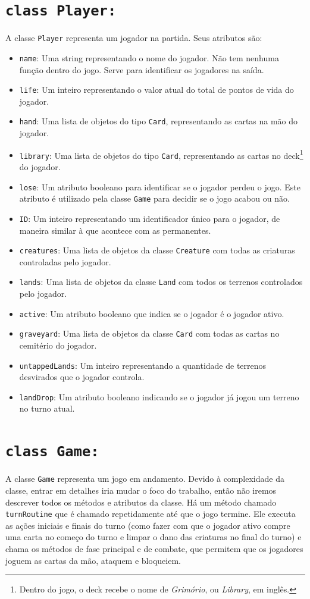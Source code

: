 \documentclass[dvipsnames]{book}
\begin{document}
\section{\texttt{class Player:}}
A classe \texttt{Player} representa um jogador na partida. Seus atributos são:
\begin{itemize}
  \item\texttt{name}: Uma string representando o nome do jogador. Não tem nenhuma função
  dentro do jogo. Serve para identificar os jogadores na saída.
  \item\texttt{life}: Um inteiro representando o valor atual do total de pontos de vida
  do jogador.
  \item\texttt{hand}: Uma lista de objetos do tipo \texttt{Card}, representando as cartas
  na mão do jogador.
  \item\texttt{library}: Uma lista de objetos do tipo \texttt{Card}, representando as cartas
  no deck\footnote{Dentro do jogo, o deck recebe o nome de \textit{Grimório}, ou \textit{Library},
  em inglês.} do jogador.
  \item\texttt{lose}: Um atributo booleano para identificar se o jogador perdeu o jogo. Este
  atributo é utilizado pela classe \texttt{Game} para decidir se o jogo acabou ou não.
  \item\texttt{ID}: Um inteiro representando um identificador único para o jogador, de maneira
  similar à que acontece com as permanentes.
  \item\texttt{creatures}: Uma lista de objetos da classe \texttt{Creature} com todas as
  criaturas controladas pelo jogador.
  \item\texttt{lands}: Uma lista de objetos da classe \texttt{Land} com todos os terrenos
  controlados pelo jogador.
  \item\texttt{active}: Um atributo booleano que indica se o jogador é o jogador ativo.
  \item\texttt{graveyard}: Uma lista de objetos da classe \texttt{Card} com todas as cartas
  no cemitério do jogador.
  \item\texttt{untappedLands}: Um inteiro representando a quantidade de terrenos desvirados que
  o jogador controla.
  \item\texttt{landDrop}: Um atributo booleano indicando se o jogador já jogou um terreno no
  turno atual.
\end{itemize}

\section{\texttt{class Game:}}
A classe \texttt{Game} representa um jogo em andamento. Devido à complexidade da classe, entrar
em detalhes iria mudar o foco do trabalho, então não iremos descrever todos os métodos e atributos
da classe. Há um método chamado \texttt{turnRoutine} que é chamado repetidamente até que o jogo
termine. Ele executa as ações iniciais e finais do turno (como fazer com que o jogador ativo compre
uma carta no começo do turno e limpar o dano das criaturas no final do turno) e chama os métodos de
fase principal e de combate, que permitem que os jogadores joguem as cartas da mão, ataquem e
bloqueiem.
\end{document}
